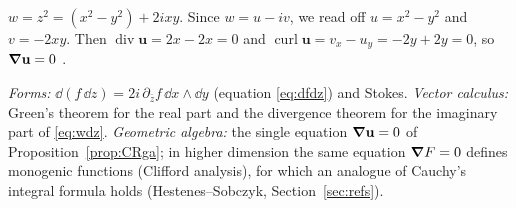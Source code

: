 \begin{example}\label{ex:monogenic}
$w=z^2=(x^2-y^2)+2ixy$. Since $w=u-iv$, we read off $u=x^2-y^2$ and $v=-2xy$. Then $\operatorname{div}\mathbf u=2x-2x=0$ and $\operatorname{curl}\mathbf u=v_x-u_y=-2y+2y=0$, so $\boldsymbol{\nabla}\mathbf u=0$ \checkmark.
\end{example}

\begin{synthesis}
\emph{Forms:} $\dd(f\,\dd z)=2i\,\partial_{\bar z}f\,\dd x\wedge\dd y$ (equation \eqref{eq:dfdz}) and Stokes. \emph{Vector calculus:} Green's theorem for the real part and the divergence theorem for the imaginary part of \eqref{eq:wdz}. \emph{Geometric algebra:} the single equation $\boldsymbol{\nabla}\mathbf u=0$ of Proposition~\ref{prop:CRga}; in higher dimension the same equation $\boldsymbol{\nabla} F=0$ defines monogenic functions (Clifford analysis), for which an analogue of Cauchy's integral formula holds (Hestenes--Sobczyk, Section~\ref{sec:refs}).
\end{synthesis}
